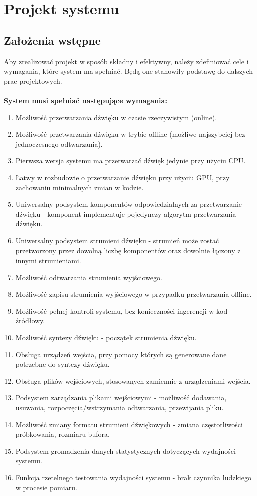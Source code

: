 \chapter{Projekt systemu}
\label{chap:Projekt systemu}

\section{Założenia wstępne}
Aby zrealizować projekt w sposób składny i efektywny, należy zdefiniować cele i wymagania, które system ma spełniać. Będą one stanowiły podstawę do dalszych prac projektowych.
\\\\
\textbf{System musi spełniać następujące wymagania:}
\begin{enumerate}
    \item Możliwość przetwarzania dźwięku w czasie rzeczywistym (online).
    \item Możliwość przetwarzania dźwięku w trybie offline (możliwe najszybciej bez jednoczesnego odtwarzania).
    \item Pierwsza wersja systemu ma przetwarzać dźwięk jedynie przy użyciu CPU.
    \item Łatwy w rozbudowie o przetwarzanie dźwięku przy użyciu GPU, przy zachowaniu minimalnych zmian w kodzie.
    \item Uniwersalny podsystem komponentów odpowiedzialnych za przetwarzanie dźwięku - komponent implementuje pojedynczy algorytm przetwarzania dźwięku.
    \item Uniwersalny podsystem strumieni dźwięku - strumień może zostać przetworzony przez dowolną liczbę komponentów oraz dowolnie łączony z innymi strumieniami.
    \item Możliwość odtwarzania strumienia wyjściowego.
    \item Możliwość zapisu strumienia wyjściowego w przypadku przetwarzania offline.
    \item Możliwość pełnej kontroli systemu, bez konieczności ingerencji w kod źródłowy.
    \item Możliwość syntezy dźwięku - początek strumienia dźwięku.
    \item Obsługa urządzeń wejścia, przy pomocy których są generowane dane potrzebne do syntezy dźwięku.
    \item Obsługa plików wejściowych, stosowanych zamiennie z urządzeniami wejścia.
    \item Podsystem zarządzania plikami wejściowymi - możliwość dodawania, usuwania, rozpoczęcia/wstrzymania odtwarzania, przewijania pliku.
    \item Możliwość zmiany formatu strumieni dźwiękowych - zmiana częstotliwości próbkowania, rozmiaru bufora.
    \item Podsystem gromadzenia danych statystycznych dotyczących wydajności systemu.
    \item Funkcja rzetelnego testowania wydajności systemu - brak czynnika ludzkiego w procesie pomiaru.
\end{enumerate}


